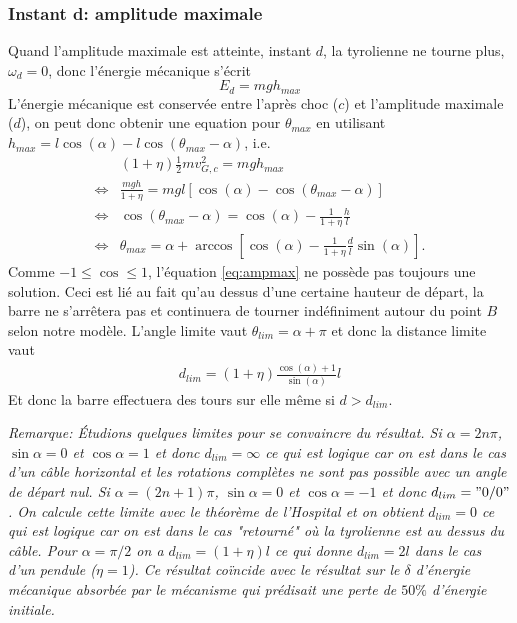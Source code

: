 \documentclass[11pt,a4paper]{exam}
\newcommand{\noteACDH}[1]{\textit{Remarque: #1}}
\begin{document}
\begin{parts}
    \subsubsection*{Instant d: amplitude maximale}
    Quand l'amplitude maximale est atteinte, instant $d$, la tyrolienne ne tourne plus, $\omega_{d}=0$, donc l'énergie mécanique s'écrit
    \begin{equation}
        E_{d} = mgh_{max}
    \end{equation}
    L'énergie mécanique est conservée entre l'après choc ($c$) et l'amplitude maximale ($d$), on peut donc obtenir une equation pour $\theta_{max}$ en utilisant $h_{max}=l \cos(\alpha)-l\cos(\theta_{max}-\alpha)$, i.e.
    \begin{align}
        &(1+\eta)\frac{1}{2}mv_{G,c}^2 = mgh_{max} \nonumber\\
        \Leftrightarrow&\frac{mgh}{1+\eta} =mg l [\cos(\alpha)-\cos(\theta_{max}-\alpha)] \nonumber\\
        \Leftrightarrow&\cos(\theta_{max}-\alpha) = \cos(\alpha) - \frac{1}{1+\eta}\frac{h}{l}\nonumber\\
        \Leftrightarrow&\theta_{max}=\alpha+\arccos\left[\cos(\alpha) - \frac{1}{1+\eta}\frac{d}{l}\sin(\alpha)\right].
        \label{eq:ampmax}
    \end{align}
    Comme $-1\leq \cos \leq 1$, l'équation \eqref{eq:ampmax} ne possède pas toujours une solution.
    Ceci est lié au fait qu'au dessus d'une certaine hauteur de départ, la barre ne s'arrêtera pas et continuera de tourner indéfiniment autour du point $B$ selon notre modèle.
    L'angle limite vaut $\theta_{lim}=\alpha+\pi$ et donc la distance limite vaut
    \begin{align}
        d_{lim} = (1+\eta) \frac{\cos(\alpha) + 1}{\sin(\alpha)}l
        \label{eq:hlim}
    \end{align}
    Et donc la barre effectuera des tours sur elle même si $d>d_{lim}$.
    
    
    \noteACDH{Étudions quelques limites pour se convaincre du résultat.
    Si $\alpha=2n\pi$, $\sin\alpha=0$ et $\cos\alpha=1$ et donc $d_{lim}=\infty$ ce qui est logique car on est dans le cas d'un câble horizontal et les rotations complètes ne sont pas possible avec un angle de départ nul.
    Si $\alpha=(2n+1)\pi$, $\sin\alpha=0$ et $\cos\alpha=-1$ et donc $d_{lim}="0/0"$.
    On calcule cette limite avec le théorème de l'Hospital et on obtient  $d_{lim}=0$ ce qui est logique car on est dans le cas "retourné" où la tyrolienne est au dessus du câble.
    Pour $\alpha =\pi/2$ on a $d_{lim}=(1+\eta)l$ ce qui donne $d_{lim}=2l$ dans le cas d'un pendule ($\eta = 1$). 
    Ce résultat coïncide avec le résultat sur le $\delta$ d'énergie mécanique absorbée par le mécanisme qui prédisait une perte de $50\%$ d'énergie initiale. }

\end{parts}
\end{document}

